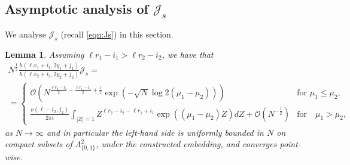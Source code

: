 \documentclass[11pt]{article}
\theoremstyle{plain}
\newtheorem{lemma}[theorem]{Lemma}
\theoremstyle{definition}
\numberwithin{equation}{section}
\begin{document}
\subsection{Asymptotic analysis of $\mathcal{J}_s$}\label{sec:Js}
We analyse $\mathcal{J}_s$ (recall \eqref{eqn:Js}) in this section. 
\begin{lemma}%
\label{lemma:Js}
Assuming $\ell r_1-i_1> \ell r_2-i_2$, we have that 
\begin{multline}
N^{\frac{1}{2}}
\frac{h(\ell x_1+i_1,2y_1+j_1)}{h(\ell x_2+i_2,2y_2+j_2)}
 \mathcal{J}_{s}=
%
%
%
\\=\begin{cases}
\mathcal{O}
\left(N^{\frac{\ell r_2-i_2}{2}-\frac{\ell r_1-i_1}{2}+\frac{1}{2}} \exp\left(-\sqrt{N}\log 2(\mu_1-\mu_2)\right)\right) 
 &\text{for } \mu_1 \leq \mu_2,
\\
\frac{\nu(\ell-i_2,j_2)}{2\pi i}
%
%
\int_{|Z|=1} 
  Z^{\ell r_2-i_2-\ell r_1+i_1}
\exp((\mu_1-\mu_2) Z)
dZ
+
%
\mathcal{O}\left(N^{-\frac{1}{2}}\right)
&\text{for} \quad \mu_1>\mu_2,
\end{cases}
\end{multline}
as $N\rightarrow\infty$ and in particular the left-hand side is uniformly bounded in $N$ on compact subsets of $\Lambda_{\{0,1\}}^2$, under the constructed embedding, and converges point-wise.
%
%
\end{lemma}
\end{document}
